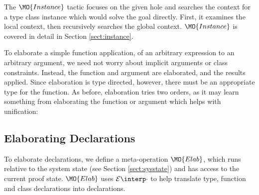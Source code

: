 The $\MO{Instance}$ tactic focuses on the given hole and searches the context for
a type class instance which would solve the goal directly. First, it examines the local
context, then recursively searches the global context. $\MO{Instance}$ is covered
in detail in Section \ref{sect:instance}.

To elaborate a simple function application, of an arbitrary expression to an arbitrary
argument, we need not worry about implicit arguments or class constraints. Instead,
the function and argument are elaborated, and the results applied. Since elaboration
is type directed, however, there must be an appropriate type for the function.
As before, elaboration tries two orders, as it may learn something from elaborating
the function or argument which helps with unification:




\subsection{Elaborating Declarations}

To elaborate declarations, we define a meta-operation $\MO{Elab}$, which runs
relative to the system state (see Section \ref{sect:sysstate}) and has access to the
current proof state. $\MO{Elab}$ uses $\ttinterp{\cdot}$ to help translate
\IdrisM{} type, function and class declarations into \TT{} declarations.

\newcommand{\edo}[1]{\RW{do}\:\AR{#1}}

